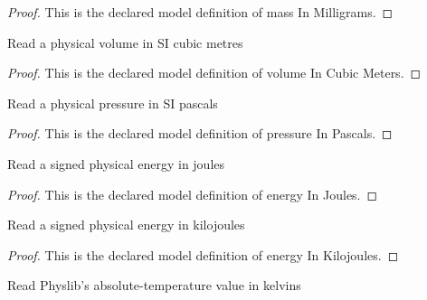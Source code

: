 \begin{proof}
  This is the declared model definition of mass In Milligrams.
\end{proof}
\begin{definition}
  \label{def:physics:phyx-mini-0414:phyxminiproblems-problemphyxmini0414-volumeincubicmeters}
  Read a physical volume in SI cubic metres
\end{definition}
\begin{proof}
  This is the declared model definition of volume In Cubic Meters.
\end{proof}
\begin{definition}
  \label{def:physics:phyx-mini-0414:phyxminiproblems-problemphyxmini0414-pressureinpascals}
  Read a physical pressure in SI pascals
\end{definition}
\begin{proof}
  This is the declared model definition of pressure In Pascals.
\end{proof}
\begin{definition}
  \label{def:physics:phyx-mini-0414:phyxminiproblems-problemphyxmini0414-energyinjoules}
  Read a signed physical energy in joules
\end{definition}
\begin{proof}
  This is the declared model definition of energy In Joules.
\end{proof}
\begin{definition}
  \label{def:physics:phyx-mini-0414:phyxminiproblems-problemphyxmini0414-energyinkilojoules}
  Read a signed physical energy in kilojoules
\end{definition}
\begin{proof}
  This is the declared model definition of energy In Kilojoules.
\end{proof}
\begin{definition}
  \label{def:physics:phyx-mini-0414:phyxminiproblems-problemphyxmini0414-temperatureinkelvin}
  Read Physlib's absolute-temperature value in kelvins
\end{definition}
